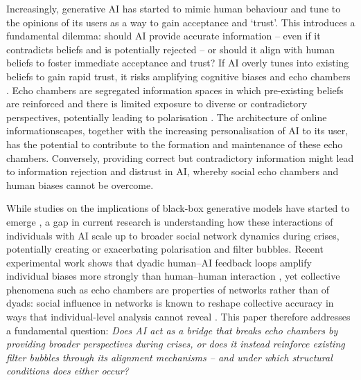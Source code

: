 \documentclass[sn-apacite]{sn-jnl}
\begin{document}
Increasingly, generative AI has started to mimic human behaviour and tune to the opinions of its users \citep{sharma2024generative} as a way to gain acceptance and `trust'. %
This introduces a fundamental dilemma: should AI provide accurate information -- even if it contradicts beliefs and is potentially rejected -- or should it align with human beliefs to foster immediate acceptance and trust? If AI overly tunes into existing beliefs to gain rapid trust, it risks amplifying cognitive biases and echo chambers \citep{ekstrom2022self}. %
Echo chambers are segregated information spaces in which pre-existing beliefs are reinforced and there is limited exposure to diverse or contradictory perspectives, potentially leading to polarisation \citep{jeon2024hearhere}. The architecture of online informationscapes, together with the increasing personalisation of AI to its user, has the potential to contribute to the formation and maintenance of these echo chambers. Conversely, providing correct but contradictory information might lead to information rejection and distrust in AI, whereby social echo chambers and human biases cannot be overcome.

While studies on the implications of black-box generative models have started to emerge \citep{sharma2024generative,zhang2024see}, %
a gap in current research is understanding how these interactions of individuals with AI scale up to broader social network dynamics during crises, potentially creating or exacerbating polarisation and filter bubbles. Recent experimental work shows that dyadic human--AI feedback loops amplify individual biases more strongly than human--human interaction \citep{glickman2024human}, %
yet collective phenomena such as echo chambers are properties of networks rather than of dyads: social influence in networks is known to reshape collective accuracy in ways that individual-level analysis cannot reveal \citep{lorenz2011social,becker2017network}. %
This paper therefore addresses a fundamental question: \emph{Does AI act as a bridge that breaks echo chambers by providing broader perspectives during crises, or does it instead reinforce existing filter bubbles through its alignment mechanisms -- and under which structural conditions does either occur?}
\end{document}
